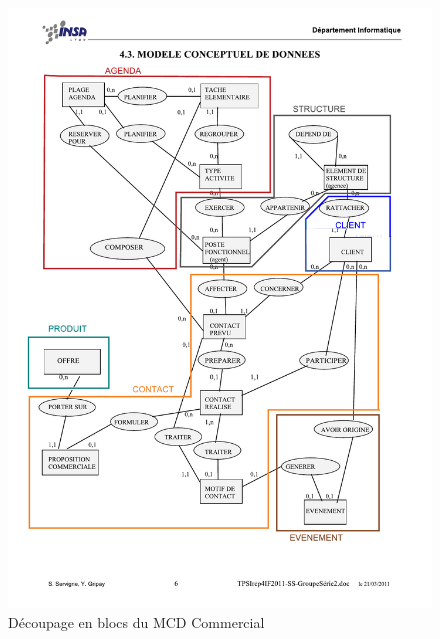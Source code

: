 \begin{figure}[H]
	\begin{center}
		\includegraphics[scale=0.8,clip, trim = 5mm 30mm 3mm 30mm]{Includes/SOA-Blocs-2.pdf}
		\caption{Découpage en blocs du MCD Commercial}
	\end{center}
\end{figure}
